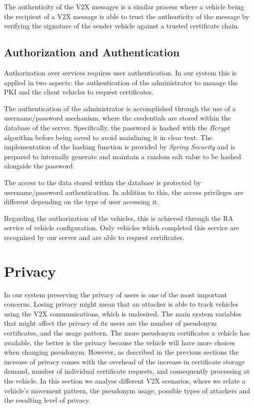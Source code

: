 		The authenticity of the V2X messages is a similar process where a vehicle being the recipient of a V2X message is able to trust the authenticity of the message by verifying the signature of the sender vehicle against a trusted certificate chain. 
		
		\subsection{Authorization and Authentication}
		Authorization over services requires user authentication. In our system this is applied in two aspects: the authentication of the administrator to manage the PKI and the client vehicles to request certificates. 
		
		The authentication of the administrator is accomplished through the use of a username/password mechanism, where the credentials are stored within the database of the server. Specifically, the password is hashed with the \textit{Bcrypt} algorithm before being saved to avoid mainlining it in clear text. The implementation of the hashing function is provided by \textit{Spring Security} and is prepared to internally generate and maintain a random salt value to be hashed alongside the password.
		
		The access to the data stored within the database is protected by username/password authentication. In addition to this, the access privileges are different depending on the type of user accessing it.
		
		Regarding the authorization of the vehicles, this is achieved through the RA service of vehicle configuration. Only vehicles which completed this service are recognized by our server and are able to request certificates.
		
		
		\section{Privacy}
		In our system preserving the privacy of users is one of the most important concerns. Losing privacy might mean that an attacker is able to track vehicles using the V2X communications, which is undesired. The main system variables that might affect the privacy of its users are the number of pseudonym certificates, and the usage pattern. The more pseudonym certificates a vehicle has available, the better is the privacy because the vehicle will have more choices when changing pseudonym. However, as described in the previous sections the increase of privacy comes with the overhead of the increase in certificate storage demand, number of individual certificate requests, and consequently processing at the vehicle. In this section we analyse different V2X scenarios, where we relate a vehicle's movement pattern, the pseudonym usage, possible types of attackers and the resulting level of privacy.
		
